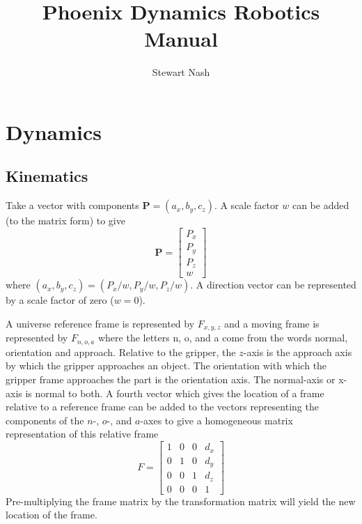 \documentclass[11pt]{book}
\theoremstyle{example}
\begin{document}
\title{Phoenix Dynamics Robotics Manual}
\author{Stewart Nash}

\maketitle

\tableofcontents

\mainmatter

\chapter{Dynamics}

\section{Kinematics}

Take a vector with components $\mathbf{P}=(a_x,b_y,c_z)$. A scale factor $w$ can be added (to the matrix form) to give
\begin{equation}
	\mathbf{P}=
	\begin{bmatrix}
		P_x\\
		P_y\\
		P_z\\
		w
	\end{bmatrix}
\end{equation}
where $(a_x,b_y,c_z)=(P_x/w,P_y/w,P_z/w)$. A direction vector can be represented by a scale factor of zero ($w=0$).

A universe reference frame is represented by $F_{x,y,z}$ and a moving frame is represented by $F_{n,o,a}$ where the letters n, o, and a come from the words normal, orientation and approach. Relative to the gripper, the $z$-axis is the approach axis by which the gripper approaches an object. The orientation with which the gripper frame approaches the part is the orientation axis. The normal-axis or x-axis is normal to both. A fourth vector which gives the location of a frame relative to a reference frame can be added to the vectors representing the components of the $n$-, $o$-, and $a$-axes to give a homogeneous matrix representation of this relative frame
\begin{equation}
	F=
	\begin{bmatrix}
		1&0&0&d_x\\
		0&1&0&d_y\\
		0&0&1&d_z\\
		0&0&0&1
	\end{bmatrix}
\end{equation}
Pre-multiplying the frame matrix by the transformation matrix will yield the new location of the frame.
\end{document}
